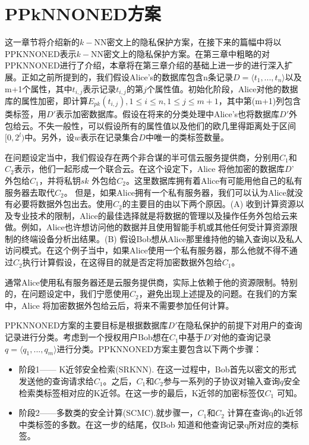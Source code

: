 \chapter{PPkNNONED方案}
\vspace{-0.2cm}
这一章节将介绍新的$k-$NN密文上的隐私保护方案，在接下来的篇幅中将以PPKNNONED表示$k-$NN密文上的隐私保护方案。在第三章中粗略的对PPKNNONED进行了介绍，本章将在第三章介绍的基础上进一步的进行深入扩展。正如之前所提到的，我们假设Alice's的数据库包含n条记录$D=\langle t_1,...,t_n\rangle$以及m+1个属性，其中$t_{i,j}$表示记录$t_{i,j}$的第$j$个属性值。初始化阶段，Alice对他的数据库的属性加密，即计算$E_{pk}(t_{i,j}),1 \leq i \leq n,1 \leq j \leq m+1$，其中第(m+1)列包含类标签，用$D'$表示加密数据库。假设在将来的分类处理中Alice's也将数据库$D'$外包给云。不失一般性，可以假设所有的属性值以及他们的欧几里得距离处于区间$[0,2^l)$中。另外，设$w$表示在记录集合$D$中唯一的类标签数量。

在问题设定当中，我们假设存在两个非合谋的半可信云服务提供商，分别用$C_1$和$C_2$表示，他们一起形成一个联合云。在这个设定下，Alice 将他加密的数据库$D’$ 外包给$C_1$，并将私钥$sk$
外包给$C_2$。这里数据库拥有着Alice有可能用他自己的私有服务器去取代$C_2$。 但是，如果Alice拥有一个私有服务器，我们可以认为Alice就没有必要将数据外包出去。使用$C_2$的主要目的由以下两个原因。(A) 收到计算资源以及专业技术的限制，Alice的最佳选择就是将数据的管理以及操作任务外包给云来做。例如，Alice也许想访问他的数据并且使用智能手机或其他任何受计算资源限制的终端设备分析出结果。(B) 假设Bob想从Alice那里维持他的输入查询以及私人访问模式。在这个例子当中，如果Alice使用一个私有服务器，那么他就不得不通过$C_2$执行计算假设，在这得目的就是否定将加密数据外包给$C_1$。

通常Alice使用私有服务器还是云服务提供商，实际上依赖于他的资源限制。特别的，在问题设定中，我们宁愿使用$C_2$，避免出现上述提及的问题。在我们的方案中，Alice 将加密数据外包给云后，将来不需要参加任何计算。

PPKNNONED方案的主要目标是根据数据库$D'$在隐私保护的前提下对用户的查询记录进行分类。考虑到一个授权用户Bob想在$C_1$中基于$D'$对他的查询记录$q=\langle q_1,...,q_m\rangle$进行分类。PPKNNONED方案主要包含以下两个步骤：
\begin{itemize}
\item 阶段1—— K近邻安全检索(SRKNN). 在这一过程中，Bob首先以密文的形式发送他的查询请求给$C_1$。之后，$C_1$和$C_2$参与一系列的子协议对输入查询$q$安全检索类标签相对应的K近邻。在这一步的最后，K近邻的加密标签仅$C_1$ 可知。
\item 阶段2——多数类的安全计算(SCMC).就步骤一，$C_1$和$C_2$ 计算在查询q的k近邻中类标签的多数。在这一步的结尾，仅Bob 知道和他查询记录q所对应的类标签。
\end{itemize}

